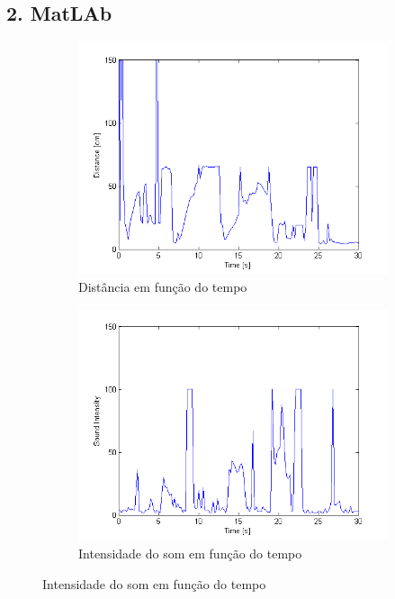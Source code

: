 \documentclass{article}
\begin{document}
\subsection*{2. MatLAb}
\begin{figure}[H]
    \centering
    \begin{subfigure}{.5\textwidth}
        \includegraphics[scale=.5]{ultra}
        \caption{Distância em função do tempo}
    \end{subfigure}%
    \begin{subfigure}{.5\textwidth}
        \includegraphics[scale=.5]{sound}
        \caption{Intensidade do som em função do tempo}
    \end{subfigure}%
    \newline


\end{figure}
\end{document}
